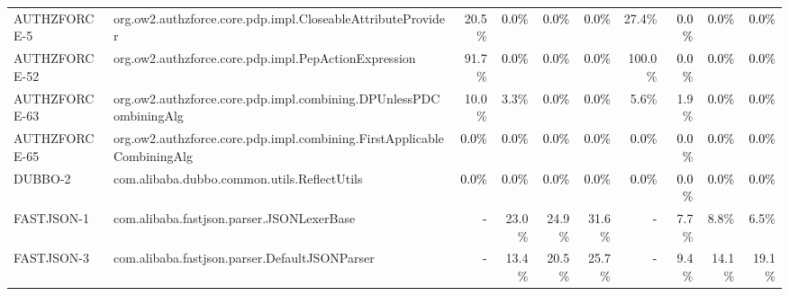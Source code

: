 \begin{tabular}{ ll rrrr rrrr}
AUTHZFORCE-5  &  org.ow2.authzforce.core.pdp.impl.CloseableAttributeProvider & 20.5\% & \cellcolor{light-gray} \textcolor{black}{0.0\%} & \cellcolor{light-gray} \textcolor{black}{0.0\%} & \cellcolor{light-gray} \textcolor{black}{0.0\%} & 27.4\% & \cellcolor{light-gray} \textcolor{black}{0.0\%} & \cellcolor{light-gray} \textcolor{black}{0.0\%} & \cellcolor{light-gray} \textcolor{black}{0.0\%}\\ 
AUTHZFORCE-52  &  org.ow2.authzforce.core.pdp.impl.PepActionExpression & 91.7\% & \cellcolor{light-gray} \textcolor{black}{0.0\%} & \cellcolor{light-gray} \textcolor{black}{0.0\%} & \cellcolor{light-gray} \textcolor{black}{0.0\%} & 100.0\% & \cellcolor{light-gray} \textcolor{black}{0.0\%} & \cellcolor{light-gray} \textcolor{black}{0.0\%} & \cellcolor{light-gray} \textcolor{black}{0.0\%}\\ 
AUTHZFORCE-63  &  org.ow2.authzforce.core.pdp.impl.combining.DPUnlessPDCombiningAlg & 10.0\% & 3.3\% & \cellcolor{light-gray} \textcolor{black}{0.0\%} & \cellcolor{light-gray} \textcolor{black}{0.0\%} & 5.6\% & 1.9\% & \cellcolor{light-gray} \textcolor{black}{0.0\%} & \cellcolor{light-gray} \textcolor{black}{0.0\%}\\ 
AUTHZFORCE-65  &  org.ow2.authzforce.core.pdp.impl.combining.FirstApplicableCombiningAlg & \cellcolor{light-gray} \textcolor{black}{0.0\%} & \cellcolor{light-gray} \textcolor{black}{0.0\%} & \cellcolor{light-gray} \textcolor{black}{0.0\%} & \cellcolor{light-gray} \textcolor{black}{0.0\%} & \cellcolor{light-gray} \textcolor{black}{0.0\%} & \cellcolor{light-gray} \textcolor{black}{0.0\%} & \cellcolor{light-gray} \textcolor{black}{0.0\%} & \cellcolor{light-gray} \textcolor{black}{0.0\%}\\ 
DUBBO-2  &  com.alibaba.dubbo.common.utils.ReflectUtils & \cellcolor{light-gray} \textcolor{black}{0.0\%} & \cellcolor{light-gray} \textcolor{black}{0.0\%} & \cellcolor{light-gray} \textcolor{black}{0.0\%} & \cellcolor{light-gray} \textcolor{black}{0.0\%} & \cellcolor{light-gray} \textcolor{black}{0.0\%} & \cellcolor{light-gray} \textcolor{black}{0.0\%} & \cellcolor{light-gray} \textcolor{black}{0.0\%} & \cellcolor{light-gray} \textcolor{black}{0.0\%}\\ 
FASTJSON-1  &  com.alibaba.fastjson.parser.JSONLexerBase & \cellcolor{light-gray} \textcolor{black}{-} & 23.0\% & 24.9\% & 31.6\% & \cellcolor{light-gray} \textcolor{black}{-} & 7.7\% & 8.8\% & 6.5\%\\ 
FASTJSON-3  &  com.alibaba.fastjson.parser.DefaultJSONParser & \cellcolor{light-gray} \textcolor{black}{-} & 13.4\% & 20.5\% & 25.7\% & \cellcolor{light-gray} \textcolor{black}{-} & 9.4\% & 14.1\% & 19.1\%\\ 

\end{tabular}
